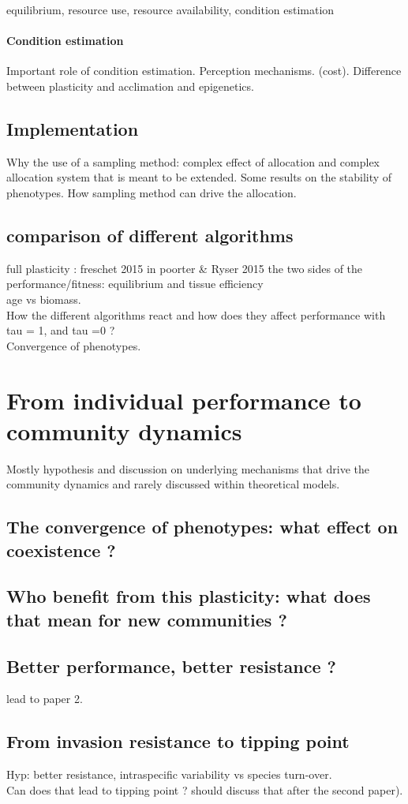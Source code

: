  equilibrium, resource use, resource availability, condition estimation
\paragraph{Condition estimation}
Important role of condition estimation. Perception mechanisms. (cost). Difference between plasticity and acclimation and epigenetics. 

\subsection{Implementation}
Why the use of a sampling method: complex effect of allocation and complex allocation system that is meant to be extended. Some results on the stability of phenotypes. How sampling method can drive the allocation.


\subsection{comparison of different algorithms}
full plasticity : freschet 2015 in poorter \& Ryser 2015
the two sides of the performance/fitness: equilibrium and tissue efficiency\\
age vs biomass.\\
How the different algorithms react and how does they affect performance with tau = 1, and tau =0 ?\\
Convergence of phenotypes.

\section{From individual performance to community dynamics}
Mostly hypothesis and discussion on underlying mechanisms that drive the community dynamics and rarely discussed within theoretical models.

\subsection{The convergence of phenotypes: what effect on coexistence ?}


\subsection{Who benefit from this plasticity: what does that mean for new communities ?}

\subsection{Better performance, better resistance ?}
lead to paper 2.

\subsection{From invasion resistance to tipping point}
Hyp: better resistance, intraspecific variability vs species turn-over.\\

Can does that lead to tipping point ? should discuss that after the second paper).
